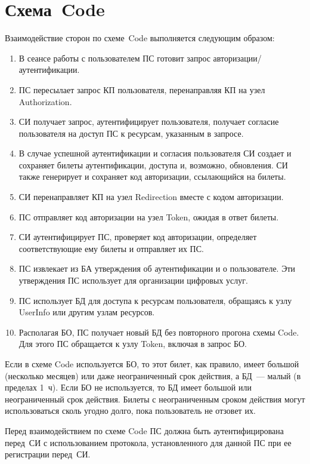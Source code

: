 \section{Схема~Code}\label{OIDC.Code}

Взаимодействие сторон по схеме~Code выполняется следующим образом:

\begin{enumerate}
\item 
В сеансе работы с пользователем ПС готовит запрос авторизации/аутентификации.

\item 
ПС пересылает запрос КП пользователя, перенаправляя КП на узел Authorization.

\item 
СИ получает запрос, аутентифицирует пользователя, получает согласие пользователя
на доступ ПС к ресурсам, указанным в запросе.

\item 
В случае успешной аутентификации и согласия пользователя СИ создает и сохраняет
билеты аутентификации, доступа и, возможно, обновления. СИ также генерирует и
сохраняет код авторизации, ссылающийся на билеты.

\item 
СИ перенаправляет КП на узел Redirection вместе с кодом авторизации.
 
\item 
ПС отправляет код авторизации на узел Token, ожидая в ответ билеты. 

\item 
СИ аутентифицирует ПС, проверяет код авторизации, определяет соответствующие ему
билеты и отправляет их ПС.

\item 
ПС извлекает из БА утверждения об аутентификации и о пользователе. Эти
утверждения ПС использует для организации цифровых услуг.

\item 
ПС использует БД для доступа к ресурсам пользователя,
обращаясь к узлу UserInfo или другим узлам ресурсов. 

\item 
Располагая БО, ПС получает новый БД без повторного прогона схемы 
Code. Для этого ПС обращается к узлу Token, включая в запрос БО.
\end{enumerate}

Если в схеме Code используется БО, то этот билет, как правило, 
имеет большой (несколько месяцев) или даже неограниченный срок действия,
а БД~--- малый (в пределах 1~ч). 
%
Если БО не используется, то БД имеет большой или неограниченный срок 
действия. 
%
Билеты с неограниченным сроком действия могут использоваться сколь 
угодно долго, пока пользователь не отзовет их.

Перед взаимодействием по схеме Code ПС должна быть аутентифицирована перед~СИ с 
использованием протокола, установленного для данной ПС при ее регистрации 
перед~СИ.
